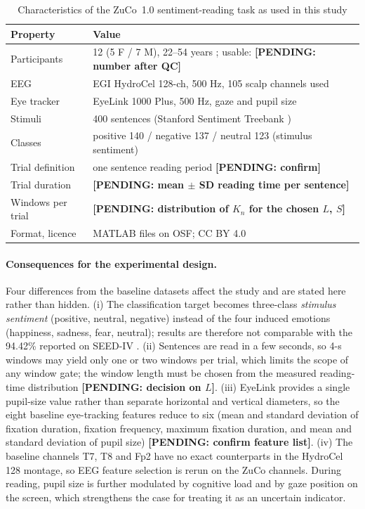 \documentclass[11pt,a4paper]{article}
\newcommand{\pending}[1]{\textcolor{red!75!black}{\textbf{[PENDING: #1]}}}
\begin{document}
\begin{table}[t]
\centering\small
\caption{Characteristics of the ZuCo~1.0 sentiment-reading task as used in this study}\label{tab:dataset}
\begin{tabular}{@{}ll@{}}
\toprule
Property & Value\\
\midrule
Participants & 12 (5 F / 7 M), 22--54 years \cite{Hollenstein2018}; usable: \pending{number after QC}\\
EEG & EGI HydroCel 128-ch, 500 Hz, 105 scalp channels used\\
Eye tracker & EyeLink 1000 Plus, 500 Hz, gaze and pupil size\\
Stimuli & 400 sentences (Stanford Sentiment Treebank \cite{Socher2013})\\
Classes & positive 140 / negative 137 / neutral 123 (stimulus sentiment)\\
Trial definition & one sentence reading period \pending{confirm}\\
Trial duration & \pending{mean $\pm$ SD reading time per sentence}\\
Windows per trial & \pending{distribution of $K_n$ for the chosen $L$, $S$}\\
Format, licence & MATLAB files on OSF; CC BY 4.0\\
\bottomrule
\end{tabular}
\end{table}

\paragraph{Consequences for the experimental design.}
Four differences from the baseline datasets affect the study and are stated here rather than hidden. (i) The classification target becomes three-class \emph{stimulus sentiment} (positive, neutral, negative) instead of the four induced emotions (happiness, sadness, fear, neutral); results are therefore not comparable with the 94.42\% reported on SEED-IV \cite{FarhadiSedehi2024a}. (ii) Sentences are read in a few seconds, so 4-s windows may yield only one or two windows per trial, which limits the scope of any window gate; the window length must be chosen from the measured reading-time distribution \pending{decision on $L$}. (iii) EyeLink provides a single pupil-size value rather than separate horizontal and vertical diameters, so the eight baseline eye-tracking features reduce to six (mean and standard deviation of fixation duration, fixation frequency, maximum fixation duration, and mean and standard deviation of pupil size) \pending{confirm feature list}. (iv) The baseline channels T7, T8 and Fp2 have no exact counterparts in the HydroCel 128 montage, so EEG feature selection is rerun on the ZuCo channels. During reading, pupil size is further modulated by cognitive load and by gaze position on the screen, which strengthens the case for treating it as an uncertain indicator.
\end{document}
